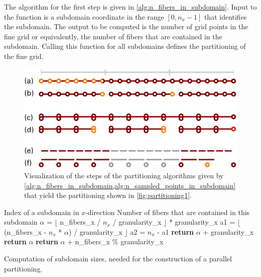 The algorithm for the first step is given in \cref{alg:n_fibers_in_subdomain}. Input to the function  is a subdomain coordinate in the range $[0,n_x-1]$ that identifies the subdomain. The output to be computed is the number of grid points in the fine grid or equivalently, the number of fibers that are contained in the subdomain. Calling this function for all subdomains defines the partitioning of the fine grid.

\begin{figure}
  \centering%
  \includegraphics[width=\textwidth]{images/implementation/partitioning_algorithm.pdf}%
  \caption{Visualization of the steps of the partitioning algorithms given by \cref{alg:n_fibers_in_subdomain,alg:n_sampled_points_in_subdomain} that yield the partitioning shown in \cref{fig:partitioning1}.}%
  \label{fig:partitioning_algorithm}%
\end{figure}%

\begin{algorithm}
  \begin{algorithmic}[1]%
    \Require Index of a subdomain in $x$-direction
    \Ensure Number of fibers that are contained in this subdomain
    \Statex
    \State   $\alpha$ = $\lfloor$ n\_fibers\_x / $n_x$ / granularity\_x $\rfloor$ * granularity\_x   \label{alg:3.2}
    \Statex
    \State a1 = $\lfloor$(n\_fibers\_x - $n_x$ * $\alpha$) / granularity\_x $\rfloor$ \label{alg:3.3}  
    \State a2 = $n_x$ - a1                        \label{alg:3.4}              
    \Statex
      \label{alg:3.5}
      \State \textbf{return} $\alpha$ + granularity\_x \label{alg:3.6}
    \label{alg:3.7}
      \State \textbf{return} $\alpha$                        \label{alg:3.8}
    \Else  {}  \label{alg:3.9}
      \State \textbf{return} $\alpha$ + n\_fibers\_x \% granularity\_x  \label{alg:3.10}
    \EndIf
    \EndProcedure
  \end{algorithmic}%
  \caption{Computation of subdomain sizes, needed for the construction of a parallel partitioning.}%
  \label{alg:n_fibers_in_subdomain}%
\end{algorithm}%

